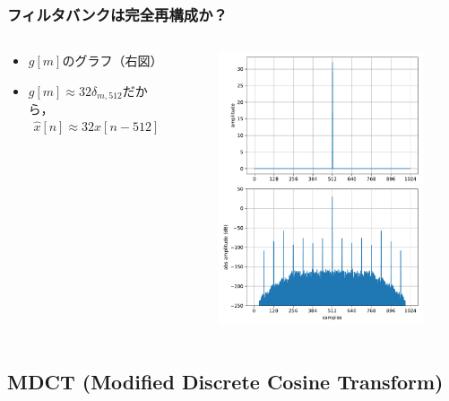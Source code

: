 \documentclass[14pt,xcolor=dvipsnames,table,dvipdfmx]{beamer}
\begin{document}
\begin{frame}[c]
    \frametitle{フィルタバンクは完全再構成か？}
    \begin{columns}
        \begin{column}{0.475\textwidth}
            \begin{itemize}
                \item $g[m]$のグラフ（右図）
                \item $g[m] \approx 32\delta_{m,512}$だから，
                    \begin{align*}
                        \hat{x}[n] \approx 32 x[n - 512]
                    \end{align*}
            \end{itemize}
        \end{column}
        \begin{column}{0.65\textwidth}
            \vspace*{-13pt}
            \begin{figure}
                \includegraphics[width=65mm]{./figs/impluse_responce_of_MP3_analysis_synthesis_filter.pdf}
            \end{figure}
        \end{column}
    \end{columns}
\end{frame}

\subsection{MDCT (Modified Discrete Cosine Transform)}
\end{document}
